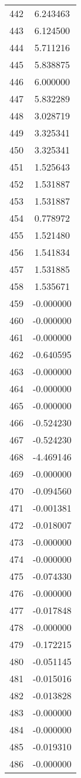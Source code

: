 \documentclass[12pt]{article}
\begin{document}
\begin{longtable}{@{}cc@{}}
442 & 6.243463 \\
443 & 6.124500 \\
444 & 5.711216 \\
445 & 5.838875 \\
446 & 6.000000 \\
447 & 5.832289 \\
448 & 3.028719 \\
449 & 3.325341 \\
450 & 3.325341 \\
451 & 1.525643 \\
452 & 1.531887 \\
453 & 1.531887 \\
454 & 0.778972 \\
455 & 1.521480 \\
456 & 1.541834 \\
457 & 1.531885 \\
458 & 1.535671 \\
459 & -0.000000 \\
460 & -0.000000 \\
461 & -0.000000 \\
462 & -0.640595 \\
463 & -0.000000 \\
464 & -0.000000 \\
465 & -0.000000 \\
466 & -0.524230 \\
467 & -0.524230 \\
468 & -4.469146 \\
469 & -0.000000 \\
470 & -0.094560 \\
471 & -0.001381 \\
472 & -0.018007 \\
473 & -0.000000 \\
474 & -0.000000 \\
475 & -0.074330 \\
476 & -0.000000 \\
477 & -0.017848 \\
478 & -0.000000 \\
479 & -0.172215 \\
480 & -0.051145 \\
481 & -0.015016 \\
482 & -0.013828 \\
483 & -0.000000 \\
484 & -0.000000 \\
485 & -0.019310 \\
486 & -0.000000 \\

\end{longtable}
\end{document}
